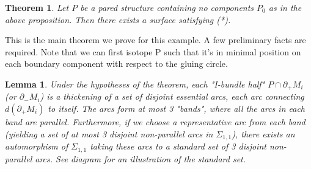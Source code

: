 \documentclass[12pt]{amsart}
\newtheorem{thm}[theorem]{Theorem}
\newtheorem{lemma}[theorem]{Lemma}
\theoremstyle{definition}
\newcommand{\bd}{\partial}
\newcommand{\Si}{\Sigma}
\begin{document}
\begin{thm}

Let $P$ be a pared structure containing no components $P_0$ as in the above
proposition. Then there exists a surface satisfying (*).

\end{thm}

This is the main theorem we prove for this example. A few preliminary facts are
required. Note that we can first isotope P such that it's in minimal position
on each boundary component with respect to the gluing circle.

\begin{lemma}

Under the hypotheses of the theorem, each "I-bundle half" $P \cap
\bd_+M_i$ (or $\bd_-M_i$) is a thickening of a set of disjoint essential arcs, each arc
connecting $d(\bd_+M_i)$ to itself. The arcs form at most 3 "bands", where all the
arcs in each band are parallel.  Furthermore, if we choose a representative arc
from each band (yielding a set of at most 3 disjoint non-parallel arcs in
$\Si_{1,1}$), there exists an automorphism of $\Si_{1,1}$ taking these arcs to a standard set
of 3 disjoint non-parallel arcs.  See diagram for an illustration of the
standard set.

\end{lemma}
\end{document}
